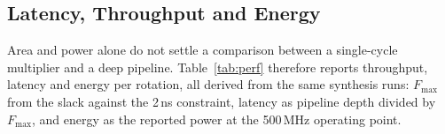 %
%

\subsection{Latency, Throughput and Energy}
\label{sec:perf}

Area and power alone do not settle a comparison between a single-cycle
multiplier and a deep pipeline. Table~\ref{tab:perf} therefore reports
throughput, latency and energy per rotation, all derived from the same
synthesis runs: $F_{\max}$ from the slack against the 2\,ns constraint,
latency as pipeline depth divided by $F_{\max}$, and energy as the reported
power at the 500\,MHz operating point.

\begin{table}[t]
\caption{Performance at two word lengths. $\dagger$ marks a design that
consumes $\sin/\cos$ it does not generate, and is therefore not a complete
RoPE unit.}
\label{tab:perf}
\centering
{}
\end{table}

